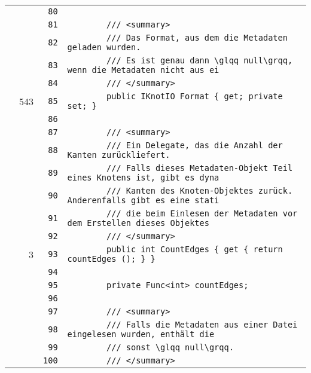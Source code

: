 \documentclass[a4paper,10pt]{article}
\begin{document}
\begin{longtable}[l]{lrrl}
\cellcolor{gray} &  & \verb~80~ & \verb~~\\
\cellcolor{gray} &  & \verb~81~ & \verb~        /// <summary>~\\
\cellcolor{gray} &  & \verb~82~ & \verb~        /// Das Format, aus dem die Metadaten geladen wurden.~\\
\cellcolor{gray} &  & \verb~83~ & \verb~        /// Es ist genau dann \glqq null\grqq, wenn die Metadaten nicht aus ei~\\
\cellcolor{gray} &  & \verb~84~ & \verb~        /// </summary>~\\
\cellcolor{green} & 543 & \verb~85~ & \verb~        public IKnotIO Format { get; private set; }~\\
\cellcolor{gray} &  & \verb~86~ & \verb~~\\
\cellcolor{gray} &  & \verb~87~ & \verb~        /// <summary>~\\
\cellcolor{gray} &  & \verb~88~ & \verb~        /// Ein Delegate, das die Anzahl der Kanten zurückliefert.~\\
\cellcolor{gray} &  & \verb~89~ & \verb~        /// Falls dieses Metadaten-Objekt Teil eines Knotens ist, gibt es dyna~\\
\cellcolor{gray} &  & \verb~90~ & \verb~        /// Kanten des Knoten-Objektes zurück. Anderenfalls gibt es eine stati~\\
\cellcolor{gray} &  & \verb~91~ & \verb~        /// die beim Einlesen der Metadaten vor dem Erstellen dieses Objektes ~\\
\cellcolor{gray} &  & \verb~92~ & \verb~        /// </summary>~\\
\cellcolor{green} & 3 & \verb~93~ & \verb~        public int CountEdges { get { return countEdges (); } }~\\
\cellcolor{gray} &  & \verb~94~ & \verb~~\\
\cellcolor{gray} &  & \verb~95~ & \verb~        private Func<int> countEdges;~\\
\cellcolor{gray} &  & \verb~96~ & \verb~~\\
\cellcolor{gray} &  & \verb~97~ & \verb~        /// <summary>~\\
\cellcolor{gray} &  & \verb~98~ & \verb~        /// Falls die Metadaten aus einer Datei eingelesen wurden, enthält die~\\
\cellcolor{gray} &  & \verb~99~ & \verb~        /// sonst \glqq null\grqq.~\\
\cellcolor{gray} &  & \verb~100~ & \verb~        /// </summary>~\\

\end{longtable}
\end{document}

